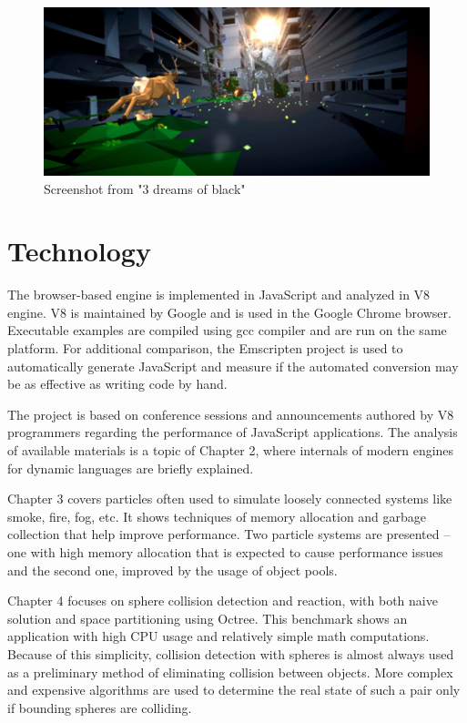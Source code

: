 \begin{figure}[h!]
  \caption{Screenshot from "3 dreams of black"}
  \label{img:rome}
  \centering
	\includegraphics[width=12cm]{summary/rome.jpg}
\end{figure}

\section{Technology}

The browser-based engine is implemented in JavaScript and analyzed in V8 engine. V8 is maintained by Google and is used in the Google Chrome browser. Executable examples are compiled using gcc compiler and are run on the same platform. For additional comparison, the Emscripten project is used to automatically generate JavaScript and measure if the automated conversion may be as effective as writing code by hand.

The project is based on conference sessions and announcements authored by V8 programmers regarding the performance of JavaScript applications. The analysis of available materials is a topic of Chapter 2, where internals of modern engines for dynamic languages are briefly explained.

Chapter 3 covers particles often used to simulate loosely connected systems like smoke, fire, fog, etc. It shows techniques of memory allocation and garbage collection that help improve performance. Two particle systems are presented -- one with high memory allocation that is expected to cause performance issues and the second one, improved by the usage of object pools.

Chapter 4 focuses on sphere collision detection and reaction, with both naive solution and space partitioning using Octree. This benchmark shows an application with high CPU usage and relatively simple math computations. Because of this simplicity, collision detection with spheres is almost always used as a preliminary method of eliminating collision between objects. More complex and expensive algorithms are used to determine the real state of such a pair only if bounding spheres are colliding.

